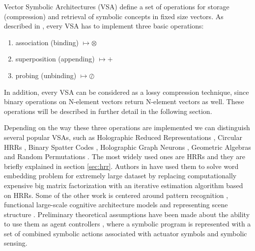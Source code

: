 \documentclass[conference]{IEEEtran}
\begin{document}
	Vector Symbolic Architectures (VSA) define a set of operations for storage (compression) and retrieval of symbolic concepts in fixed size vectors.
As described in \cite{Levy:2008:VectorSymbolicArchitectures}, every VSA has to implement three basic operations:
	\begin{enumerate}
		\item association (binding) $\mapsto \otimes$
		\item superposition (appending) $\mapsto +$
		\item probing (unbinding) $\mapsto \oslash$
	\end{enumerate}
	
	In addition, every VSA can be considered as a lossy compression technique, since binary operations on N-element vectors return N-element vectors as well. These operations will be described in further detail in the following section. 
	
	Depending on the way these three operations are implemented we can distinguish several popular VSAs, such as Holographic Reduced Representations \cite{Plate:1995:HolographicReducedRepresentations}, Circular HRRs \cite{DeVine:2010:Semanticoscillations}, Binary Spatter Codes \cite{Kanerva:1994:SpatterCodeEncoding}, Holographic Graph Neurons \cite{Kleyko:2016:HolographicGraphNeuron}, Geometric Algebras \cite{Patyk-Lonska:2011:DistributedRepresentationsBased} and Random Permutations \cite{Recchia:2015:EncodingSequentialInformation}.
The most widely used ones are HRRs and they are briefly explained in section \ref{sec:hrr}.
Authors in \cite{Golosio:2015:CognitiveNeuralArchitecture} have used them to solve word embedding problem for extremely large dataset by replacing computationally expensive big matrix factorization with an iterative estimation algorithm based on HRRs.
Some of the other work is centered around pattern recognition \cite{Kleyko:2016:PatternRecognitionVector}, functional large-scale cognitive architecture models \cite{Eliasmith:2012:LargeScaleModel} and representing scene structure \cite{scene-structure}.
Preliminary theoretical assumptions have been made about the ability to use them as agent controllers \cite{Levy:2013:LearningBehaviorHierarchies}, where a symbolic program is represented with a set of combined symbolic actions associated with actuator symbols and symbolic sensing.
	
\end{document}

